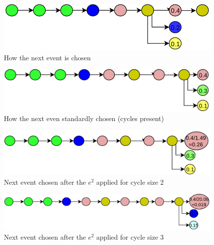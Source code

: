 \begin{figure}[!ht]
	\begin{center}  
		\includegraphics[scale=0.35]{nocycle-algo-1.png}
		\caption{How the next event is chosen}
		\label{figure:nocycle1}	
	\end{center}
\end{figure}

\begin{figure}[!ht]
	\begin{center}  
		\includegraphics[scale=0.35]{nocycle-algo-2.png}
		\caption{How the next even standardly chosen (cycles present)}
		\label{figure:nocycle2}	
	\end{center}
\end{figure}

\begin{figure}[!ht]
	\begin{center}  
		\includegraphics[scale=0.35]{nocycle-algo-3.png}
		\caption{Next event chosen after the $e^{2}$ applied for cycle size 2}
		\label{figure:nocycle3}	
	\end{center}
\end{figure}

\begin{figure}[!ht]
	\begin{center}  
		\includegraphics[scale=0.35]{nocycle-algo-4.png}
		\caption{Next event chosen after the $e^{2}$ applied for cycle size 3}
		\label{figure:nocycle4}	
	\end{center}
\end{figure}

